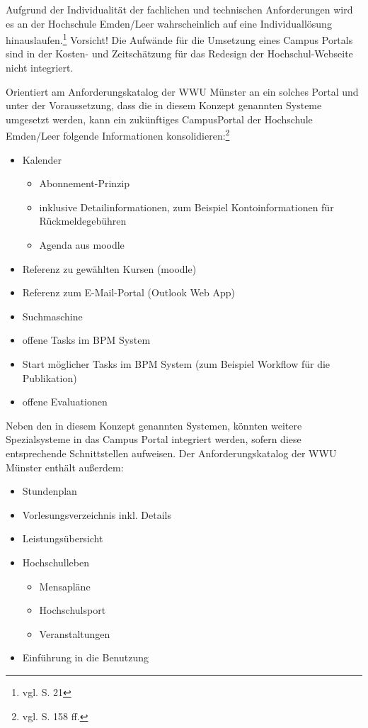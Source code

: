 Aufgrund der Individualität der fachlichen und technischen Anforderungen wird es an der Hochschule Emden/Leer wahrscheinlich auf eine Individuallösung hinauslaufen.\footnote{vgl. \cite{dini_webportale_2007} S. 21} Vorsicht! Die Aufwände für die Umsetzung eines Campus Portals sind in der Kosten- und Zeitschätzung für das Redesign der Hochschul-Webseite nicht integriert.

Orientiert am Anforderungskatalog der WWU Münster an ein solches Portal und unter der Voraussetzung, dass die in diesem Konzept genannten Systeme umgesetzt werden, kann ein zukünftiges CampusPortal der Hochschule Emden/Leer folgende Informationen konsolidieren:\footnote{vgl. \cite{vogl_fortschritte_2012} S. 158 ff.}

\begin{itemize}
	\item Kalender
	\begin{itemize}
		\item Abonnement-Prinzip
		\item inklusive Detailinformationen, zum Beispiel Kontoinformationen für Rückmeldegebühren
		\item Agenda aus moodle
	\end{itemize}
	\item Referenz zu gewählten Kursen (moodle)
	\item Referenz zum E-Mail-Portal (Outlook Web App)
	\item Suchmaschine
	\item offene Tasks im BPM System
	\item Start möglicher Tasks im BPM System (zum Beispiel Workflow für die Publikation)
	\item offene Evaluationen
\end{itemize}

Neben den in diesem Konzept genannten Systemen, könnten weitere Spezialsysteme in das Campus Portal integriert werden, sofern diese entsprechende Schnittstellen aufweisen. Der Anforderungskatalog der WWU Münster enthält außerdem:

\begin{itemize}
	\item Stundenplan
	\item Vorlesungsverzeichnis inkl. Details
	\item Leistungsübersicht
	\item Hochschulleben
	\begin{itemize}
		\item Mensapläne
		\item Hochschulsport
		\item Veranstaltungen
	\end{itemize}
	\item Einführung in die Benutzung
\end{itemize}

